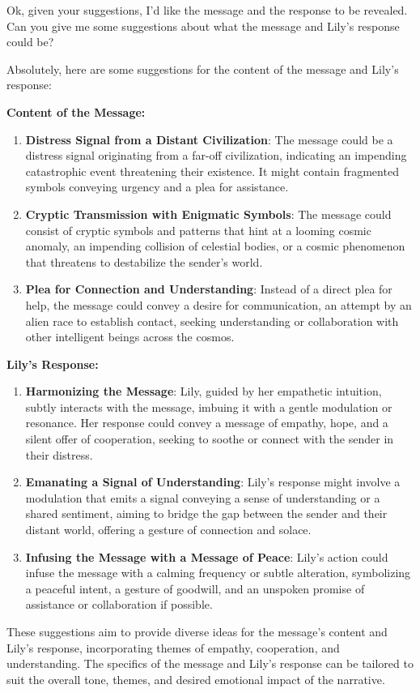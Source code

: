 \begin{qquote}
    Ok, given your suggestions, I'd like the message and the response to be revealed. Can you give me some suggestions about what the message and Lily's response could be?
\end{qquote}

\begin{aquote}
    Absolutely, here are some suggestions for the content of the message and Lily's response:\medskip

    \noindent\textbf{Content of the Message:}
    \begin{enumerate}
        \item \textbf{Distress Signal from a Distant Civilization}: The message could be a distress signal originating from a far-off civilization, indicating an impending catastrophic event threatening their existence. It might contain fragmented symbols conveying urgency and a plea for assistance.
        \item \textbf{Cryptic Transmission with Enigmatic Symbols}: The message could consist of cryptic symbols and patterns that hint at a looming cosmic anomaly, an impending collision of celestial bodies, or a cosmic phenomenon that threatens to destabilize the sender's world.
        \item \textbf{Plea for Connection and Understanding}: Instead of a direct plea for help, the message could convey a desire for communication, an attempt by an alien race to establish contact, seeking understanding or collaboration with other intelligent beings across the cosmos.
    \end{enumerate}

    \noindent\textbf{Lily's Response:}
    \begin{enumerate}
        \item \textbf{Harmonizing the Message}: Lily, guided by her empathetic intuition, subtly interacts with the message, imbuing it with a gentle modulation or resonance. Her response could convey a message of empathy, hope, and a silent offer of cooperation, seeking to soothe or connect with the sender in their distress.
        \item \textbf{Emanating a Signal of Understanding}: Lily's response might involve a modulation that emits a signal conveying a sense of understanding or a shared sentiment, aiming to bridge the gap between the sender and their distant world, offering a gesture of connection and solace.
        \item \textbf{Infusing the Message with a Message of Peace}: Lily's action could infuse the message with a calming frequency or subtle alteration, symbolizing a peaceful intent, a gesture of goodwill, and an unspoken promise of assistance or collaboration if possible.
    \end{enumerate}
    
    These suggestions aim to provide diverse ideas for the message's content and Lily's response, incorporating themes of empathy, cooperation, and understanding. The specifics of the message and Lily's response can be tailored to suit the overall tone, themes, and desired emotional impact of the narrative.
\end{aquote}


